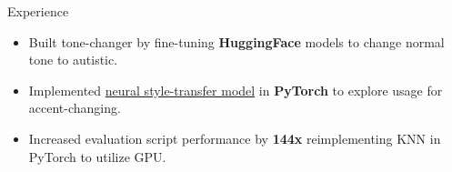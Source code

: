 \documentclass{resume} %
\begin{document}
\begin{workSection}{Experience}
	\experienceItem[
	company=UTEP Vision and Learning Lab,
	location=El Paso{,} TX,
	position=Undergraduate Research Assistant,
	duration=January 2024 - May 2024,
	]
	\begin{itemize}
		\vspace{-0.5em}
		\itemsep -6pt {}
		\item Built tone-changer by fine-tuning \textbf{HuggingFace} models to change normal tone to autistic. %
		\item Implemented \href{https://github.com/AshkanArabim/neural-style-transfer}{{neural style-transfer model}} in \textbf{PyTorch} to explore usage for accent-changing.
		\item Increased evaluation script performance by
			\textbf{144x} 
			reimplementing KNN in PyTorch to utilize GPU.
	\end{itemize}
	

\end{workSection}
\end{document}
